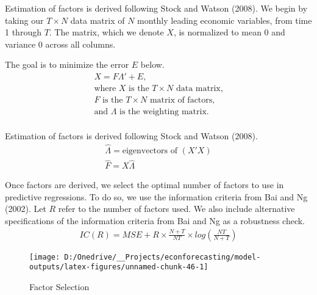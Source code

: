 \documentclass[11pt, letterpaper]{article}\usepackage[]{graphicx}\usepackage[]{color}
\begin{document}
Estimation of factors is derived following Stock and Watson (2008). We begin by taking our $T \times N$ data matrix of $N$ monthly leading economic variables, from time 1 through $T$. The matrix, which we denote $X$, is normalized to mean 0 and variance 0 across all columns.

The goal is to minimize the error $E$ below.
\begin{align*}
	X = F  \Lambda ' + E,\\
	\text{where $X$ is the $T \times N$ data matrix,}\\
	\text{$F$ is the $T \times N$ matrix of factors,}\\
	\text{and $\Lambda$ is the weighting matrix.}\\
\end{align*}

Estimation of factors is derived following Stock and Watson (2008).
\begin{align*}
	\widehat{\Lambda} = \text{eigenvectors of } (X'X)\\
	\widehat{F} = X \widehat{\Lambda}
\end{align*}



Once factors are derived, we select the optimal number of factors to use in predictive regressions. To do so, we use the information criteria from Bai and Ng (2002). Let $R$ refer to the number of factors used. We also include alternative specifications of the information criteria from Bai and Ng as a robustness check.
\begin{align*}
	IC(R) = MSE + R \times \frac{N+T}{NT} \times log\left(\frac{NT}{N+T}\right)
\end{align*}

\begin{figure}[H]

{\centering \texttt{[image: D:/Onedrive/\_\_Projects/econforecasting/model-outputs/latex-figures/unnamed-chunk-46-1]} 

}

\caption[Factor Selection]{Factor Selection}\label{fig:unnamed-chunk-46}
\end{figure}
\end{document}

